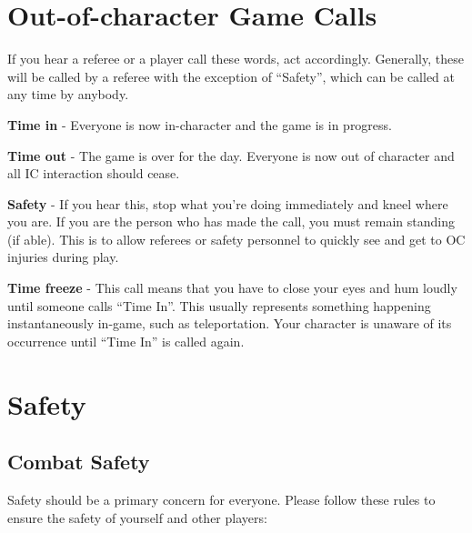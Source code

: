 \chapter{Out-of-character Game Calls}

If you hear a referee or a player call these words, act accordingly. Generally, these will be called by a referee with the exception of ``Safety'', which can be called at any time by anybody.

\textbf{Time in} - Everyone is now in-character and the game is in progress.

\textbf{Time out} - The game is over for the day. Everyone is now out of character and all IC interaction should cease.

\textbf{Safety} - If you hear this, stop what you're doing immediately and kneel where you are. If you are the person who has made the call, you must remain standing (if able). This is to allow referees or safety personnel to quickly see and get to OC injuries during play.

\textbf{Time freeze} - This call means that you have to close your eyes and hum loudly until someone calls ``Time In''. This usually represents something happening instantaneously in-game, such as teleportation. Your character is unaware of its occurrence until ``Time In'' is called again.

\chapter{Safety}

\section{Combat Safety}

Safety should be a primary concern for everyone. Please follow these rules to ensure the safety of yourself and other players:


